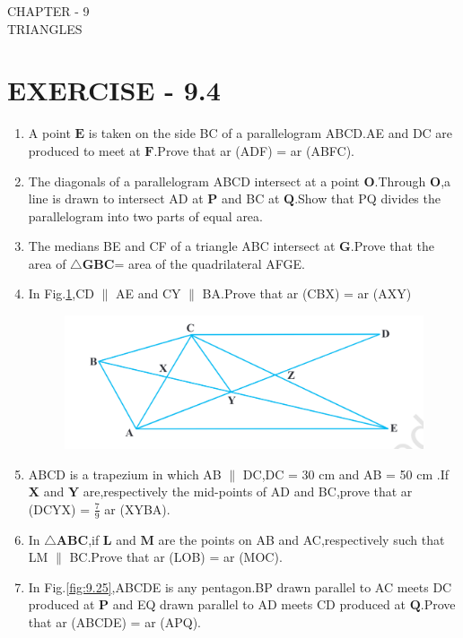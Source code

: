 \documentclass[12pt]{article}
\let\vec\mathbf
\begin{document}
\begin{center}
\textbf\large{CHAPTER - 9  \\  TRIANGLES}
\section*{EXERCISE - 9.4}
\end{center}

\begin{enumerate}

\item A point $\vec{E} $ is taken on the side BC of a parallelogram ABCD.AE and  DC are produced to meet at $\vec{F}$.Prove that  ar (ADF) = ar (ABFC).
\item The diagonals of a parallelogram ABCD intersect at a point $\vec{O}$.Through $\vec{O}$,a line is drawn to intersect AD at $\vec{P}$ and BC at $\vec{Q}$.Show that PQ divides the parallelogram into two parts of equal area.
\item The medians BE and CF of a triangle ABC intersect at $\vec{G}$.Prove that the area of $ \triangle\vec{GBC} $= area of the quadrilateral AFGE.	
\item In Fig.\ref{fig:9.24},CD $\parallel$ AE  and CY $\parallel$ BA.Prove that ar (CBX) = ar (AXY)
\begin{figure}[h]
	\centering
	\includegraphics[width=\columnwidth]{Figs/Fig9.24.png}
	\caption{}
	\label{fig:9.24}
\end{figure}
\item ABCD is a trapezium in which AB $\parallel$ DC,DC = 30 cm  and AB = 50 cm .If $\vec{X}$ and $\vec{Y}$ are,respectively the mid-points of AD and BC,prove that  ar (DCYX) = $\frac{7}{9}$ ar (XYBA).
\item  In $ \triangle\vec{ABC} $,if $\vec{L}$ and $\vec{M}$ are the points on AB and AC,respectively such that LM $\parallel$ BC.Prove that ar (LOB) = ar (MOC).
\item In Fig.\ref{fig:9.25},ABCDE is any pentagon.BP drawn parallel to AC meets DC produced at $\vec{P}$ and EQ drawn parallel to AD meets CD produced at $\vec{Q}$.Prove that ar (ABCDE) = ar (APQ).

\end{enumerate}
\end{document}
